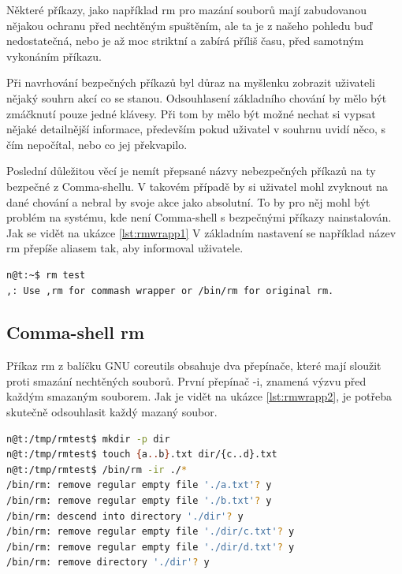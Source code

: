 \documentclass[thesis=M,czech]{FITthesis}[2012/06/26]
\begin{document}
Některé příkazy, jako například rm pro mazání souborů mají zabudovanou nějakou ochranu před nechtěným spuštěním, ale ta je z našeho pohledu buď nedostatečná, nebo je až moc striktní a zabírá příliš času, před samotným vykonáním příkazu.

Při navrhování bezpečných příkazů byl důraz na myšlenku zobrazit uživateli nějaký souhrn akcí co se stanou. Odsouhlasení základního chování by mělo být zmáčknutí pouze jedné klávesy. Při tom by mělo být možné nechat si vypsat nějaké detailnější informace, především pokud uživatel v souhrnu uvidí něco, s čím nepočítal, nebo co jej překvapilo.

Poslední důležitou věcí je nemít přepsané názvy nebezpečných příkazů na ty bezpečné z Comma-shellu. V takovém případě by si uživatel mohl zvyknout na dané chování a nebral by svoje akce jako absolutní. To by pro něj mohl být problém na systému, kde není Comma-shell s bezpečnými příkazy nainstalován. Jak se vidět na ukázce \ref{lst:rmwrapp1} V základním nastavení se například název rm přepíše aliasem tak, aby informoval uživatele.

\begin{minipage}{\linewidth}
\begin{lstlisting}[language=bash, caption={Přepsání nebezpečných příkazů}, label={lst:rmwrapp1}]
n@t:~$ rm test
,: Use ,rm for commash wrapper or /bin/rm for original rm.
\end{lstlisting}
\end{minipage}


%
\subsection{Comma-shell rm}

Příkaz rm z balíčku GNU coreutils obsahuje dva přepínače, které mají sloužit proti smazání nechtěných souborů. První přepínač -i, znamená výzvu před každým smazaným souborem. Jak je vidět na ukázce \ref{lst:rmwrapp2}, je potřeba skutečně odsouhlasit každý mazaný soubor.

\begin{minipage}{\linewidth}
\begin{lstlisting}[language=bash, caption={rm}, label={lst:rmwrapp2}]
n@t:/tmp/rmtest$ mkdir -p dir
n@t:/tmp/rmtest$ touch {a..b}.txt dir/{c..d}.txt
n@t:/tmp/rmtest$ /bin/rm -ir ./*
/bin/rm: remove regular empty file './a.txt'? y
/bin/rm: remove regular empty file './b.txt'? y
/bin/rm: descend into directory './dir'? y
/bin/rm: remove regular empty file './dir/c.txt'? y
/bin/rm: remove regular empty file './dir/d.txt'? y
/bin/rm: remove directory './dir'? y
\end{lstlisting}
\end{minipage}
\end{document}

